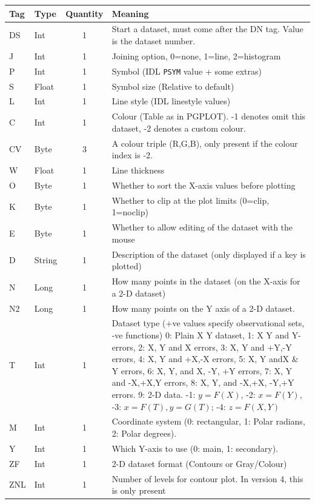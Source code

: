\documentclass[english]{article}
\begin{document}
\begin{longtable}{|llcp{8cm}|}
  \hline Tag& Type& Quantity&
  Meaning\\
  \hline
  \endhead
  \hline
  \endfoot
  DS& Int& 1& Start a dataset, must come after the DN tag. Value is the
  dataset
  number.\\
  J& Int& 1&
  Joining option, 0=none, 1=line, 2=histogram\\
  P& Int& 1&
  Symbol (IDL \texttt{PSYM} value + some extras)\\
  S& Float& 1&
  Symbol size (Relative to default)\\
  L& Int& 1&
  Line style (IDL linestyle values)\\
  C& Int& 1&
  Colour (Table as in PGPLOT). -1 denotes omit this dataset, -2
  denotes a custom colour.\\
  CV & Byte & 3 & A colour triple (R,G,B), only present if the colour
  index is -2.\\
  W& Float& 1&
  Line thickness\\
  O& Byte& 1&
  Whether to sort the X-axis values before plotting\\
  K& Byte& 1&
  Whether to clip at the plot limits (0=clip, 1=noclip)\\
  E& Byte& 1&
  Whether to allow editing of the dataset with the mouse\\
  D& String& 1&
  Description of the dataset (only displayed if a key is plotted)\\
  N& Long& 1&
  How many points in the dataset (on the X-axis for a 2-D dataset)\\
  N2& Long& 1&
  How many points on the Y axis of a 2-D dataset.\\
  T& Int& 1& Dataset type (+ve values specify observational sets, -ve
  functions) 0: Plain X Y dataset, 1: X Y and Y-errors, 2: X, Y and X
  errors, 3: X, Y and +Y,-Y errors, 4: X, Y and +X,-X errors, 5: X, Y
  andX \& Y errors, 6: X, Y, and X, -Y, +Y errors, 7: X, Y and -X,+X,Y
  errors, 8: X, Y, and -X,+X, -Y,+Y errors. 9: 2-D data. -1: $y=F(X)$, -2:
  $x=F(Y)$, -3: $x=F(T),
  y=G(T)$; -4: $z=F(X,Y)$\\
  M& Int& 1&
  Coordinate system (0: rectangular, 1: Polar radians, 2: Polar
  degrees).\\
  Y & Int & 1 & Which Y-axis to use (0: main, 1: secondary).\\
  ZF& Int& 1&
  2-D dataset format (Contours or Gray/Colour)\\
  ZNL& Int& 1&
  Number of levels for contour plot. In version 4, this is only present

\end{longtable}
\end{document}
